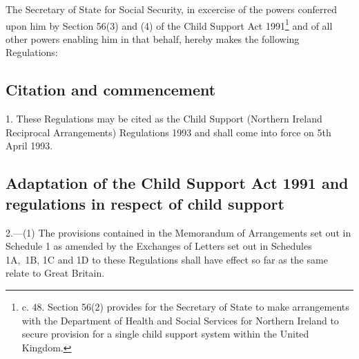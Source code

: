\documentclass[12pt,a4paper]{article}
\title{\regstitle}
\author{S.I. 1993 No. 584}
\date{Made 10th March 1993\\Laid before Parliament 15th March 1993\\Coming into force 5th April 1993}
\begin{document}
\maketitle

\noindent
The Secretary of State for Social Security, in excercise of the powers conferred upon him by Section 56(3) and (4) of the Child Support Act 1991\footnote{ c. 48. Section 56(2) provides for the Secretary of State to make arrangements with the Department of Health and Social Services for Northern Ireland to secure provision for a single child support system within the United Kingdom.} and of all other powers enabling him in that behalf, hereby makes the following Regulations:

{\sloppy

\tableofcontents

}

\setcounter{secnumdepth}{-2}

\subsection[1. Citation and commencement]{Citation and commencement}

1.  These Regulations may be cited as the Child Support (Northern Ireland Reciprocal Arrangements) Regulations 1993 and shall come into force on 5th April 1993.

\subsection[2. Adaptation of the Child Support Act 1991 and regulations in respect of child support]{Adaptation of the Child Support Act 1991 and regulations in respect of child support}

2.—(1) The provisions contained in the Memorandum of Arrangements set out in Schedule 1 
as amended by the 
Exchanges of Letters set out in Schedules~%
1A,~1B, 1C and 1D  %
to these Regulations shall have effect so far as the same relate to Great Britain.
\end{document}
